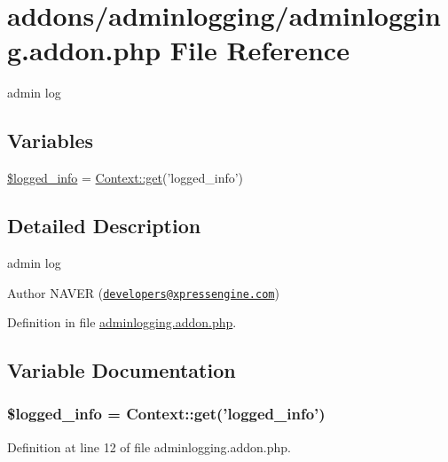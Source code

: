 \hypertarget{adminlogging_8addon_8php}{\section{addons/adminlogging/adminlogging.addon.\+php File Reference}
\label{adminlogging_8addon_8php}
}


admin log  


\subsection*{Variables}
\begin{DoxyCompactItemize}
\item 
\hyperlink{adminlogging_8addon_8php_a193c1593ceb216e9fb05b0bad01ebbc8}{\$logged\+\_\+info} = \hyperlink{classContext_a90ce25d65fe6c9778421cbb36ab3def5}{Context\+::get}('logged\+\_\+info')
\end{DoxyCompactItemize}


\subsection{Detailed Description}
admin log 

\begin{DoxyAuthor}{Author}
N\+A\+V\+E\+R (\href{mailto:developers@xpressengine.com}{\tt developers@xpressengine.\+com}) 
\end{DoxyAuthor}


Definition in file \hyperlink{adminlogging_8addon_8php_source}{adminlogging.\+addon.\+php}.



\subsection{Variable Documentation}
\hypertarget{adminlogging_8addon_8php_a193c1593ceb216e9fb05b0bad01ebbc8}{
\subsubsection[{\$logged\+\_\+info}]{\setlength{\rightskip}{0pt plus 5cm}\$logged\+\_\+info = {\bf Context\+::get}('logged\+\_\+info')}}\label{adminlogging_8addon_8php_a193c1593ceb216e9fb05b0bad01ebbc8}


Definition at line 12 of file adminlogging.\+addon.\+php.

